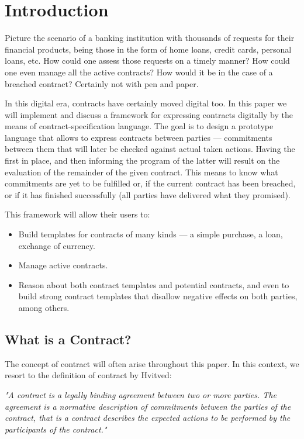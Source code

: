 \documentclass{ituthesis}
\begin{document}
\chapter{Introduction}

Picture the scenario of a banking institution with thousands of requests for their financial products, being those in the form of home loans, credit cards, personal loans, etc. How could one assess those requests on a timely manner? How could one even manage all the active contracts? How would it be in the case of a breached contract? Certainly not with pen and paper.

In this digital era, contracts have certainly moved digital too. In this paper we will implement and discuss a framework for expressing contracts digitally by the means of contract-specification language. The goal is to design a prototype language that allows to express contracts between parties --- commitments between them that will later be checked against actual taken actions. Having the first in place, and then informing the program of the latter will result on the evaluation of the remainder of the given contract. This means to know what commitments are yet to be fulfilled or, if the current contract has been breached, or if it has finished successfully (all parties have delivered what they promised).

This framework will allow their users to:
\begin{itemize}
    \item Build templates for contracts of many kinds --- a simple purchase, a loan, exchange of currency. \item Manage active contracts.
    \item Reason about both contract templates and potential contracts, and even to build strong contract templates that disallow negative effects on both parties, among others.
\end{itemize}

\section{What is a Contract?}
\label{contract}
The concept of contract will often arise throughout this paper. In this context, we resort to the definition of contract by Hvitved:
\begin{displayquote}
\textit{"A contract is a legally binding agreement between two or more parties. The agreement is a normative description of commitments between the parties of the contract, that is a contract describes the expected actions to be performed by the participants of the contract."}
\cite{hvitved2011contract}
\end{displayquote}
\end{document}
